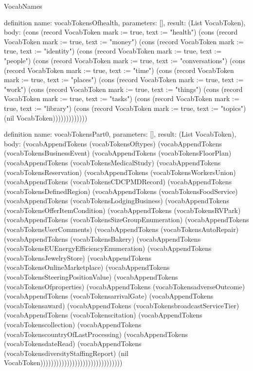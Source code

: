 \begin{lexlean}{VocabNames}
\begin{semanticmodule}
definition{
  name: vocabTokensOfhealth,
  parameters: [],
  result: (List VocabToken),
  body: (cons (record VocabToken {mark := true, text := "health"}) (cons (record VocabToken {mark := true, text := "money"}) (cons (record VocabToken {mark := true, text := "identity"}) (cons (record VocabToken {mark := true, text := "people"}) (cons (record VocabToken {mark := true, text := "conversations"}) (cons (record VocabToken {mark := true, text := "time"}) (cons (record VocabToken {mark := true, text := "places"}) (cons (record VocabToken {mark := true, text := "work"}) (cons (record VocabToken {mark := true, text := "things"}) (cons (record VocabToken {mark := true, text := "tasks"}) (cons (record VocabToken {mark := true, text := "library"}) (cons (record VocabToken {mark := true, text := "topics"}) (nil VocabToken)))))))))))))
}

definition{
  name: vocabTokensPart0,
  parameters: [],
  result: (List VocabToken),
  body: (vocabAppendTokens (vocabTokensOftypes) (vocabAppendTokens (vocabTokensBusinessEvent) (vocabAppendTokens (vocabTokensFloorPlan) (vocabAppendTokens (vocabTokensMedicalStudy) (vocabAppendTokens (vocabTokensReservation) (vocabAppendTokens (vocabTokensWorkersUnion) (vocabAppendTokens (vocabTokensCDCPMDRecord) (vocabAppendTokens (vocabTokensDefinedRegion) (vocabAppendTokens (vocabTokensFoodService) (vocabAppendTokens (vocabTokensLodgingBusiness) (vocabAppendTokens (vocabTokensOfferItemCondition) (vocabAppendTokens (vocabTokensRVPark) (vocabAppendTokens (vocabTokensSizeGroupEnumeration) (vocabAppendTokens (vocabTokensUserComments) (vocabAppendTokens (vocabTokensAutoRepair) (vocabAppendTokens (vocabTokensBakery) (vocabAppendTokens (vocabTokensEUEnergyEfficiencyEnumeration) (vocabAppendTokens (vocabTokensJewelryStore) (vocabAppendTokens (vocabTokensOnlineMarketplace) (vocabAppendTokens (vocabTokensSteeringPositionValue) (vocabAppendTokens (vocabTokensOfproperties) (vocabAppendTokens (vocabTokensadverseOutcome) (vocabAppendTokens (vocabTokensarrivalGate) (vocabAppendTokens (vocabTokensaward) (vocabAppendTokens (vocabTokensbroadcastServiceTier) (vocabAppendTokens (vocabTokenscitation) (vocabAppendTokens (vocabTokenscollection) (vocabAppendTokens (vocabTokenscountryOfLastProcessing) (vocabAppendTokens (vocabTokensdateRead) (vocabAppendTokens (vocabTokensdiversityStaffingReport) (nil VocabToken)))))))))))))))))))))))))))))))
}


\end{semanticmodule}
\end{lexlean}
